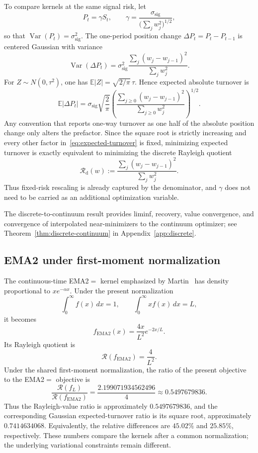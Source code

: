 \documentclass[11pt]{article}
\theoremstyle{definition}
\theoremstyle{remark}
\newcommand{\Rcal}{\mathcal R}
\begin{document}
To compare kernels at the same signal risk, let
\[
 P_t=\gamma S_t,
 \qquad
 \gamma=\frac{\sigma_{\mathrm{sig}}}
 {\bigl(\sum_jw_j^2\bigr)^{1/2}},
\]
so that $\operatorname{Var}(P_t)=\sigma_{\mathrm{sig}}^2$. The one-period
position change $\Delta P_t=P_t-P_{t-1}$ is centered Gaussian with variance
\[
 \operatorname{Var}(\Delta P_t)
 =\sigma_{\mathrm{sig}}^2
 \frac{\sum_j(w_j-w_{j-1})^2}{\sum_jw_j^2}.
\]
For $Z\sim N(0,\tau^2)$, one has
$\mathbb E|Z|=\sqrt{2/\pi}\,\tau$. Hence expected absolute turnover is
\begin{equation}\label{eq:expected-turnover}
 \mathbb E|\Delta P_t|
 =\sigma_{\mathrm{sig}}\sqrt{\frac{2}{\pi}}
 \left(
 \frac{\sum_{j\geq0}(w_j-w_{j-1})^2}
      {\sum_{j\geq0}w_j^2}
 \right)^{1/2}.
\end{equation}
Any convention that reports one-way turnover as one half of the absolute
position change only alters the prefactor. Since the square root is strictly
increasing and every other factor in~\eqref{eq:expected-turnover} is fixed,
minimizing expected turnover is exactly equivalent to minimizing the discrete
Rayleigh quotient
\[
 \Rcal_{\mathrm d}(w)
 :=\frac{\sum_j(w_j-w_{j-1})^2}{\sum_jw_j^2}.
\]
Thus fixed-risk rescaling is already captured by the denominator, and $\gamma$
does not need to be carried as an additional optimization variable.

The discrete-to-continuum result provides liminf, recovery, value convergence,
and convergence of interpolated near-minimizers to the continuum optimizer; see
Theorem~\ref{thm:discrete-continuum} in Appendix~\ref{app:discrete}.

\subsection{EMA2 under first-moment normalization}
The continuous-time EMA2$=$ kernel emphasized by Martin~\cite{Martin2021} has
density proportional to $x e^{-\alpha x}$. Under the present normalization
\[
\int_0^\infty f(x)\,dx=1,
\qquad
\int_0^\infty x f(x)\,dx=L,
\]
it becomes
\[
 f_{\mathrm{EMA2}}(x)=\frac{4x}{L^2}e^{-2x/L}.
\]
Its Rayleigh quotient is
\[
 \Rcal(f_{\mathrm{EMA2}})=\frac{4}{L^2}.
\]
Under the shared first-moment normalization, the ratio of the present objective
to the EMA2$=$ objective is
\[
 \frac{\Rcal(f_L)}{\Rcal(f_{\mathrm{EMA2}})}
 =\frac{2.199071934562496}{4}
 \approx0.5497679836.
\]
Thus the Rayleigh-value ratio is approximately $0.5497679836$, and the
corresponding Gaussian expected-turnover ratio is its square root, approximately
$0.7414634068$. Equivalently, the relative differences are $45.02\%$ and
$25.85\%$, respectively. These numbers compare the kernels after a common
normalization; the underlying variational constraints remain different.
\end{document}
